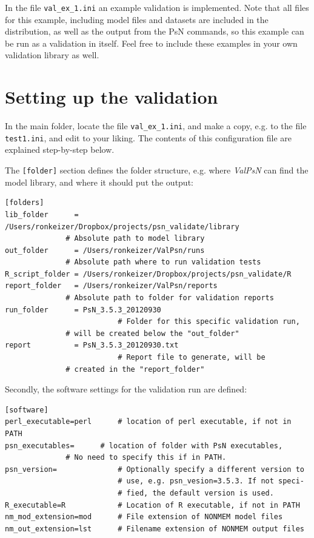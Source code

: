 \documentclass[a4,11pt]{report} \usepackage[pdftex]{graphicx}
\newcommand{\ValPsN}{\textcolor{PiranaOrange}{\textit{ValPsN}}\xspace}
\begin{document}
In the file {\tt val\_ex\_1.ini} an example validation is
implemented. Note that all files for this example, including model
files and datasets are included in the distribution, as well as the
output from the PsN commands, so this example can be run as a
validation in itself. Feel free to include these examples in your own
validation library as well.

\section{Setting up the validation}
\vspace{10pt} In the main folder, locate the file {\tt val\_ex\_1.ini},
and make a copy, e.g. to the file {\tt test1.ini}, and edit
to your liking. The contents of this configuration file are explained
step-by-step below.

\vspace{5pt}

\noindent The {\tt [folder]} section defines the folder structure,
e.g. where \ValPsN can find the model library, and where it should
put the output:

\begin{lstlisting}
[folders]
lib_folder      = /Users/ronkeizer/Dropbox/projects/psn_validate/library
			  # Absolute path to model library
out_folder      = /Users/ronkeizer/ValPsn/runs
			  # Absolute path where to run validation tests
R_script_folder = /Users/ronkeizer/Dropbox/projects/psn_validate/R
report_folder   = /Users/ronkeizer/ValPsn/reports
			  # Absolute path to folder for validation reports
run_folder      = PsN_3.5.3_20120930
                          # Folder for this specific validation run,
			  # will be created below the "out_folder"
report          = PsN_3.5.3_20120930.txt
                          # Report file to generate, will be
			  # created in the "report_folder"
\end{lstlisting}

\vspace{5pt}

\noindent Secondly, the software settings for the validation run are defined:

\begin{lstlisting}
[software]
perl_executable=perl      # location of perl executable, if not in PATH
psn_executables=	  # location of folder with PsN executables,
			  # No need to specify this if in PATH.
psn_version=              # Optionally specify a different version to
                          # use, e.g. psn_vesion=3.5.3. If not speci-
                          # fied, the default version is used.
R_executable=R            # Location of R executable, if not in PATH
nm_mod_extension=mod      # File extension of NONMEM model files
nm_out_extension=lst      # Filename extension of NONMEM output files
\end{lstlisting}
\end{document}
